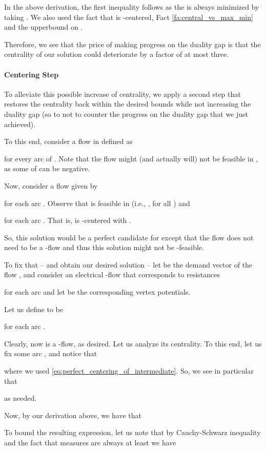 \documentclass[11pt, letterpaper]{article}
\begin{document}
In the above derivation, the first inequality follows as the  is always minimized by taking . We also used the fact that  is -centered, Fact \ref{fa:central_vs_max_min} and the upperbound on .

Therefore, we see that the price of making progress on the duality gap is that the centrality of our solution could deteriorate by a factor of at most three. 

\paragraph{Centering Step}

To alleviate this possible increase of centrality, we apply a second step that restores the centrality back within the desired bounds while not increasing the duality gap (so to not to counter the progress on the duality gap that we just achieved).

To this end, consider a flow  in  defined as

for every arc  of . Note that the flow  might (and actually will) not be feasible in , as some of  can be negative.

Now, consider a flow  given by

for each arc . Observe that  is feasible in  (i.e., , for all ) and 

for each arc . That is,  is -centered with .

So, this solution would be a perfect candidate for  except that the flow  does not need to be a -flow and thus this solution might not be -feasible. 

To fix that -- and obtain our desired solution  -- let  be the demand vector of the flow , and consider an electrical -flow  that corresponds to resistances

for each arc  and let  be the corresponding vertex potentials.

Let us define  to be

for each arc . 



Clearly, now  is a -flow, as desired. Let us analyze its centrality. To this end, let us fix some arc , and notice that

where we used \eqref{eq:perfect_centering_of_intermediate}. So, we see in particular that 

as needed. 

Now, by our derivation above, we have that


To bound the resulting expression, let us note that by Cauchy-Schwarz inequality and the fact that measures are always at least  we have 
\end{document}
